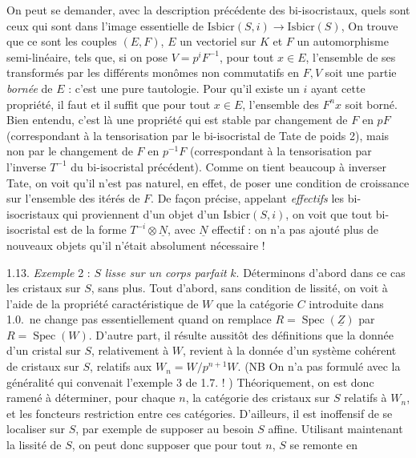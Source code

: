 \documentclass[11pt,a4paper]{article}
\begin{document}
On peut se demander, avec la description précédente des bi-isocristaux, quels
sont ceux qui sont dans l'image essentielle de
$\mathrm{Isbicr}(S,i)\to\mathrm{Isbicr}(S)$, On trouve que ce sont les couples
$(E,F)$, $E$ un vectoriel sur $K$ et $F$ un automorphisme semi-linéaire, tels
que, si on pose $V=p^iF^{-1}$, pour tout $x\in E$, l'ensemble de ses
transformés par les différents monômes non commutatifs en $F,V$ soit une
partie \emph{bornée} de $E$ : c'est une pure tautologie. Pour qu'il existe un $i$ ayant cette propriété, il
faut et il suffit que pour tout $x\in E$, l'ensemble des $F^nx$ soit borné.
Bien entendu, c'est là une propriété qui est stable par changement de $F$ en
$pF$ (correspondant à la tensorisation par le bi-isocristal de Tate de poids
2), mais non par le changement de $F$ en $p^{-1}F$ (correspondant à la
tensorisation par l'inverse $T^{-1}$ du bi-isocristal précédent). Comme on
tient beaucoup à inverser Tate, on voit qu'il n'est pas naturel, en effet, de
poser une condition de croissance sur l'ensemble des itérés de $F$. De façon
précise, appelant \emph{effectifs} les bi-isocristaux qui proviennent d'un
objet d'un $\mathrm{Isbicr}(S,i)$, on voit que tout bi-isocristal est de la
forme $T^{-i}\otimes\underline{N}$, avec $\underline{N}$ effectif : on n'a pas
ajouté plus de nouveaux objets qu'il n'était absolument nécessaire !

1.13. \emph{Exemple} 2 : $S$ \emph{lisse sur un corps parfait} $k$.
Déterminons d'abord dans ce cas les cristaux sur $S$, sans plus. Tout d'abord,
sans condition de lissité, on voit à l'aide de la propriété caractéristique de
$W$ que la catégorie $C$ introduite dans 1.0.\ ne change pas\add{,}
essentiellement\add{,} quand on remplace $R=\operatorname{Spec}(\underline{Z})$
par $R=\operatorname{Spec}(W)$. D'autre part, il résulte aussitôt des
définitions que la donnée d'un cristal sur $S$, relativement à $W$, revient à
la donnée d'un système cohérent de cristaux sur $S$, relatifs aux
$W_n=W/p^{n+1}W$. (NB On n'a pas formulé avec la généralité qui convenait
l'exemple 3 de 1.7. ! ) Théoriquement, on est donc ramené à déterminer, pour
chaque $n$, la catégorie des cristaux sur $S$ relatifs à $W_n$, et les
foncteurs restriction entre ces catégories. D'ailleurs, il est inoffensif de se
localiser sur $S$, par exemple de supposer au besoin $S$ affine. Utilisant
maintenant la lissité de $S$, on peut donc supposer que pour tout $n$, $S$ se
remonte en
\end{document}
